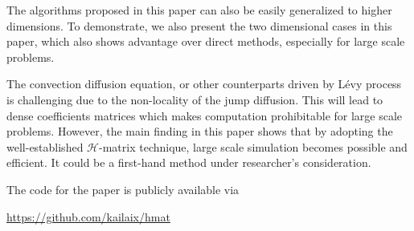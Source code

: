 \documentclass[3p,,preprint,12pt]{elsarticle}
\theoremstyle{definition}
\begin{document}
The algorithms proposed in this paper can also be easily generalized to higher dimensions. To demonstrate, we also present the two dimensional cases in this paper, which also shows advantage over direct methods, especially for large scale problems. 

The convection diffusion equation, or other counterparts driven by L\'evy process is challenging due to the non-locality of the jump diffusion. This will lead to dense coefficients matrices which makes computation prohibitable for large scale problems. However, the main finding in this paper shows that by adopting the well-established $\mathcal{H}$-matrix technique, large scale simulation becomes possible and efficient. It could be a first-hand method under researcher's consideration.    

The code for the paper is publicly available via
\begin{center}
	\url{https://github.com/kailaix/hmat}
\end{center}

\section*{\refname}


\end{document}
